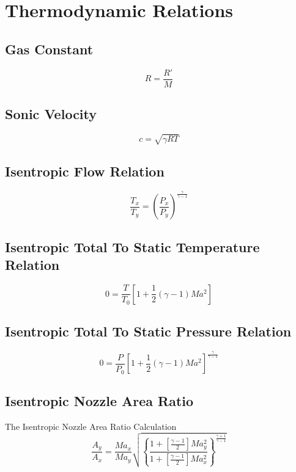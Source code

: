 \documentclass{article}
\numberwithin{equation}{section}
\begin{document}
\pagebreak

\section[Thermodynamic Relations]{Thermodynamic Relations\hfil\cite{RPE}}

\subsection{Gas Constant}
\begin{equation} \label{eq: gas constant}
    R = \frac{R'}{M}
\end{equation}

\subsection{Sonic Velocity}
\begin{equation} \label{eq: sonic velocity}
    c = \sqrt{\gamma R T}
\end{equation}

\subsection{Isentropic Flow Relation}
\begin{equation} \label{eq: flow relation}
    \frac{T_x}{T_y} = \left(\frac{P_x}{P_y}\right) ^ {\frac{\gamma}{\gamma - 1}}
\end{equation}

\subsection{Isentropic Total To Static Temperature Relation}
\begin{equation} \label{eq: temperature relation}
    0 = \frac{T}{T_0} \left[1 + \frac{1}{2} \left(\gamma - 1\right) Ma ^ 2\right]
\end{equation}

\subsection{Isentropic Total To Static Pressure Relation}
\begin{equation} \label{eq: pressure relation}
    0 = \frac{P}{P_0} \left[1 + \frac{1}{2} \left(\gamma - 1\right) Ma ^ 2\right] ^ {\frac{\gamma}{\gamma - 1}}
\end{equation}

\subsection{Isentropic Nozzle Area Ratio}
The Isentropic Nozzle Area Ratio Calculation 
\begin{equation} \label{eq: area ratio}
    \frac{A_y}{A_x} = \frac{Ma_x}{Ma_y} \sqrt{\left\{\frac{1 + \left[\frac{\gamma - 1}{2}\right] Ma_y ^ 2}{1 + \left[\frac{\gamma - 1}{2}\right] Ma_x ^ 2}\right\} ^ {\frac{\gamma + 1}{\gamma - 1}}}
\end{equation}
\end{document}

